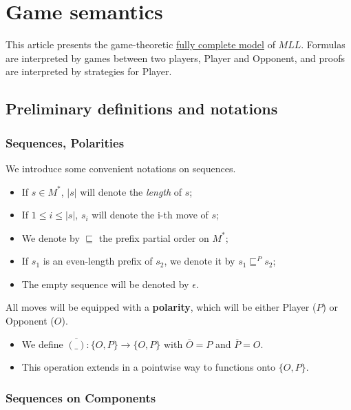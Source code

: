 \section{Game semantics}\label{game-semantics}

This article presents the game-theoretic
\href{fully_complete_model}{fully complete model} of \(MLL\). Formulas
are interpreted by games between two players, Player and Opponent, and
proofs are interpreted by strategies for Player.

\subsection{Preliminary definitions and
notations}\label{preliminary-definitions-and-notations}

\subsubsection{Sequences, Polarities}\label{sequences-polarities}

We introduce some convenient notations on sequences.

\begin{itemize}
\tightlist
\item
  If \(s\in M^*\), \(|s|\) will denote the \emph{length} of \(s\);
\item
  If \(1\leq i\leq |s|\), \(s_i\) will denote the i-th move of \(s\);
\item
  We denote by \(\sqsubseteq\) the prefix partial order on \(M^*\);
\item
  If \(s_1\) is an even-length prefix of \(s_2\), we denote it by
  \(s_1\sqsubseteq^P s_2\);
\item
  The empty sequence will be denoted by \(\epsilon\).
\end{itemize}

All moves will be equipped with a \textbf{polarity}, which will be
either Player (\(P\)) or Opponent (\(O\)).

\begin{itemize}
\tightlist
\item
  We define \(\overline{(\_)}:\{O,P\}\to \{O,P\}\) with
  \(\overline{O} = P\) and \(\overline{P} = O\).
\item
  This operation extends in a pointwise way to functions onto
  \(\{O,P\}\).
\end{itemize}

\subsubsection{Sequences on Components}\label{sequences-on-components}

